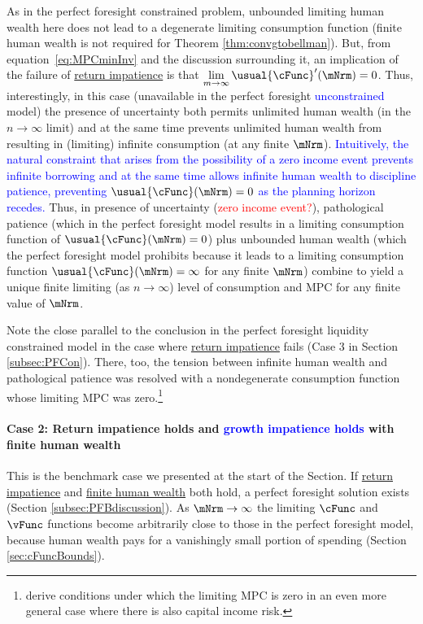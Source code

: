 \documentclass[BufferStockTheory]{subfiles}
\begin{document}
As in the perfect foresight constrained problem, unbounded limiting human wealth here does not lead to a degenerate limiting consumption function (finite human wealth is not required for Theorem \ref{thm:convgtobellman}).  But, from equation~\eqref{eq:MPCminInv} and the discussion surrounding it, an implication of the failure of \hyperlink{RIC}{return impatience} is that $\lim\limits_{m \rightarrow \infty} \usual{\cFunc}^{\prime}(\mNrm) = 0$.  Thus, interestingly, in this case (unavailable in the perfect foresight \textcolor{blue}{unconstrained} model) the presence of uncertainty both permits unlimited human wealth (in the $n\rightarrow\infty$ limit) and at the same time prevents unlimited human wealth from resulting in (limiting) infinite consumption (at any finite $\mNrm$). \textcolor{blue}{Intuitively, the natural constraint that arises from the possibility of a zero income event prevents infinite borrowing and at the same time allows infinite human wealth to discipline patience, preventing  $\usual{\cFunc}(\mNrm)=0$ as the planning horizon recedes.} Thus, in presence of uncertainty (\textcolor{red}{zero income event?}), pathological patience (which in the perfect foresight model results in a limiting consumption function of $\usual{\cFunc}(\mNrm)=0$) plus unbounded human wealth (which the perfect foresight model prohibits because it leads to a limiting consumption function $\usual{\cFunc}(\mNrm)=\infty$ for any finite $\mNrm$) combine to yield a unique finite limiting (as $n \rightarrow \infty$) level of consumption and MPC for any finite value of $\mNrm$. 

Note the close parallel to the conclusion in the perfect foresight liquidity constrained model in the case where \hyperlink{RIC}{return impatience} fails (Case 3 in Section \ref{subsec:PFCon}). There, too, the tension between infinite human wealth and pathological patience was resolved with a nondegenerate consumption function whose limiting MPC was zero.\footnote{\cite{maTodaRich} derive conditions under which the limiting MPC is zero in an even more general case where there is also capital income risk.}

\hypertarget{When-the-RIC-Holds}{}
\paragraph{Case 2: Return impatience holds and \textcolor{blue}{growth impatience holds} with finite human wealth} 
This is the benchmark case we presented at the start of the Section. If \hyperlink{RIC}{return impatience}  and \hyperlink{FHWC}{finite human wealth} both hold, a perfect foresight solution exists (Section \ref{subsec:PFBdiscussion}).  As $\mNrm \rightarrow \infty$ the limiting $\cFunc$ and $\vFunc$ functions become arbitrarily close to those in the perfect foresight model, because human wealth pays for a vanishingly small portion of spending (Section \ref{sec:cFuncBounds}).
\end{document}
